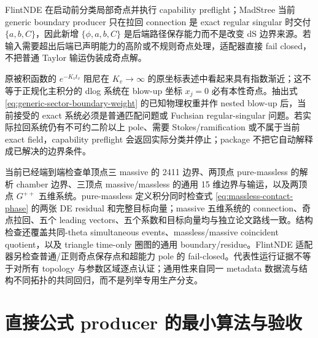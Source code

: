 \documentclass[11pt,a4paper]{ctexart}
\begin{document}
FlintNDE 在启动前分类局部奇点并执行 capability preflight；MadStree 当前 generic boundary producer 只在拉回 connection 是 exact regular singular 时交付 $\{a,b,C\}$，因此新增 $\{\phi,a,b,C\}$ 是后端路径保存能力而不是改变 dS 边界来源。若输入需要超出后端已声明能力的高阶或不规则奇点处理，适配器直接 fail closed，不把普通 Taylor 输运伪装成奇点解。

原被积函数的 $e^{-K_vt_v}$ 阻尼在 $K_v\to\infty$ 的原坐标表述中看起来具有指数渐近；这不等于正规化主积分的 dlog 系统在 blow-up 坐标 $x_j=0$ 必有本性奇点。抽出式 \eqref{eq:generic-sector-boundary-weight} 的已知物理权重并作 nested blow-up 后，当前接受的 exact 系统必须是普通匹配问题或 Fuchsian regular-singular 问题。若实际拉回系统仍有不可约二阶以上 pole、需要 Stokes/ramification 或不属于当前 exact field，capability preflight 会返回实际分类并停止；package 不把它自动解释成已解决的边界条件。

当前已经端到端检查单顶点三 massive 的 2411 边界、两顶点 pure-massless 的解析 chamber 边界、三顶点 massive/massless 的通用 15 维边界与输运，以及两顶点 $G^{++}$ 五维系统。pure-massless 定义积分同时检查式 \eqref{eq:massless-contact-phase} 的两张 DE residual 和完整目标向量；massive 五维系统的 connection、奇点拉回、五个 leading vectors、五个系数和目标向量均与独立论文路线一致。结构检查还覆盖共同-theta simultaneous events、massless/massive coincident quotient，以及 triangle time-only 圈图的通用 boundary/residue。FlintNDE 适配器另检查普通/正则奇点保存点和超能力 pole 的 fail-closed。代表性运行证据不等于对所有 topology 与参数区域逐点认证；通用性来自同一 metadata 数据流与结构不同拓扑的共同回归，而不是列举专用生产分支。

\section{直接公式 producer 的最小算法与验收}
\end{document}
